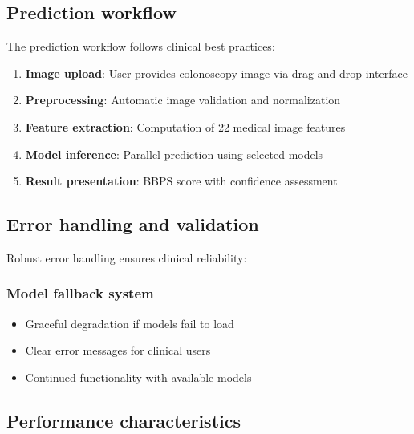 \documentclass[11pt]{article}
\begin{document}
\subsection{Prediction workflow}

The prediction workflow follows clinical best practices:

\begin{enumerate}
    \item \textbf{Image upload}: User provides colonoscopy image via drag-and-drop interface
    \item \textbf{Preprocessing}: Automatic image validation and normalization
    \item \textbf{Feature extraction}: Computation of 22 medical image features
    \item \textbf{Model inference}: Parallel prediction using selected models
    \item \textbf{Result presentation}: BBPS score with confidence assessment
\end{enumerate}

\subsection{Error handling and validation}

Robust error handling ensures clinical reliability:

\subsubsection{Model fallback system}
\begin{itemize}
    \item Graceful degradation if models fail to load
    \item Clear error messages for clinical users
    \item Continued functionality with available models
\end{itemize}

\subsection{Performance characteristics}
\end{document}
